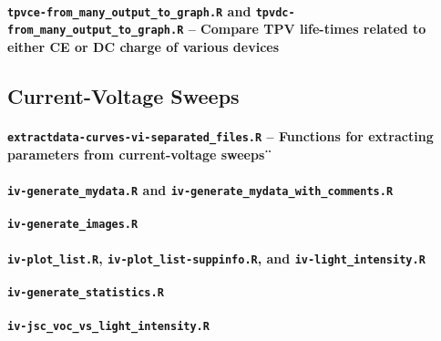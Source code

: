 				\paragraph{\texttt{tpvce-from\_many\_output\_to\_graph.R} and \texttt{tpvdc-from\_many\_output\_to\_graph.R} -- Compare TPV life\hyp{}times related to either CE or DC charge of various devices}
%
	\subsection{Current-Voltage Sweeps}
		\paragraph{\texttt{extractdata-curves-vi-separated\_files.R} -- Functions for extracting parameters from current\hyp{}voltage sweeps¨}
		\paragraph{\texttt{iv-generate\_mydata.R} and \texttt{iv-generate\_mydata\_with\_comments.R}}
		\paragraph{\texttt{iv-generate\_images.R}}
				\paragraph{\texttt{iv-plot\_list.R}, \texttt{iv-plot\_list-suppinfo.R}, and \texttt{iv-light\_intensity.R}}
		\paragraph{\texttt{iv-generate\_statistics.R}}
		\paragraph{\texttt{iv-jsc\_voc\_vs\_light\_intensity.R}}

